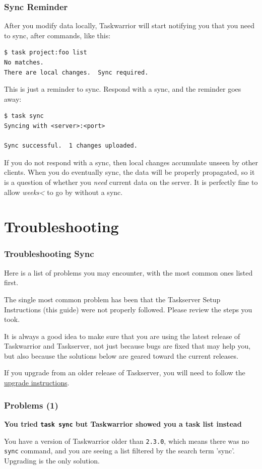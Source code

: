 \documentclass[t,handout]{beamer}
\begin{document}
\begin{frame}[fragile]\frametitle{Sync Reminder}
    After you modify data locally, Taskwarrior will start notifying you that you need to sync, after commands, like this:

    \begin{lstlisting}
$ task project:foo list
No matches.
There are local changes.  Sync required.\end{lstlisting}

    This is just a reminder to sync. Respond with a sync, and the reminder goes away:

    \begin{lstlisting}
$ task sync
Syncing with <server>:<port>

Sync successful.  1 changes uploaded.\end{lstlisting}

    If you do not respond with a sync, then local changes accumulate unseen by other clients. When you do eventually sync, the data will be properly propagated, so it is a question of whether you \emph{need} current data on the server. It is perfectly fine to allow \emph{weeks<} to go by without a sync.
\end{frame}

\section{Troubleshooting}

\begin{frame}[fragile]\frametitle{Troubleshooting Sync}
  Here is a list of problems you may encounter, with the most common
  ones listed first.

  The single most common problem has been that the Taskserver Setup Instructions (this guide) were not properly followed.  Please review the steps you took.

  It is always a good idea to make sure that you are using the latest release of Taskwarrior and Taskserver, not just because bugs are fixed that may help you, but also because the solutions below are geared toward the current releases.

  If you upgrade from an older release of Taskserver, you will need to follow the \href{http://taskwarrior.org/docs/taskserver/upgrade.html}{upgrade instructions}.
\end{frame}

\begin{frame}[fragile]\frametitle{Problems (1)}
    \textbf{You tried \texttt{task sync} but Taskwarrior showed you a task list instead}

    You have a version of Taskwarrior older than \verb+2.3.0+, which means there was no \verb+sync+ command, and you are seeing a list filtered by the search term 'sync'. Upgrading is the only solution.
\end{frame}
\end{document}
